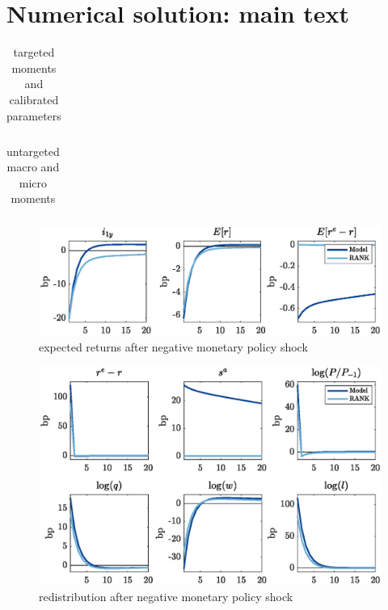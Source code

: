 \documentclass[12pt]{article}
\begin{document}
\section{Numerical solution: main text}

\begin{table}[H]
\centering
\bgroup
\def\arraystretch{1.25}
\begin{tabular}{clclcc} \hline

\end{tabular}
\egroup
\renewcommand\thetable{V}
\caption{targeted moments and calibrated parameters}
\label{tab:cal}
\end{table}

\pagebreak

\begin{table}[H]
\centering
\bgroup
\def\arraystretch{1.25}
\begin{tabular}{lC{17mm}C{17mm}C{17mm}} \hline

\end{tabular}
\egroup
\renewcommand\thetable{VI}
\caption{untargeted macro and micro moments}
\label{tab:untargeted}
\end{table}

\vspace{40pt}

\begin{figure}[H]
\centering
\includegraphics[width=\textwidth,clip=true,trim=0 0 0 0]{../output/figures/monetary_fig_split1}
\renewcommand\thefigure{2}
\caption{expected returns after negative monetary policy shock}
\end{figure}

\pagebreak

\begin{figure}[H]
\centering
\includegraphics[width=\textwidth,clip=true,trim=0 20 0 10]{../output/figures/monetary_fig_split2}
\renewcommand\thefigure{3}
\caption{redistribution after negative monetary policy shock}
\end{figure}
\end{document}
